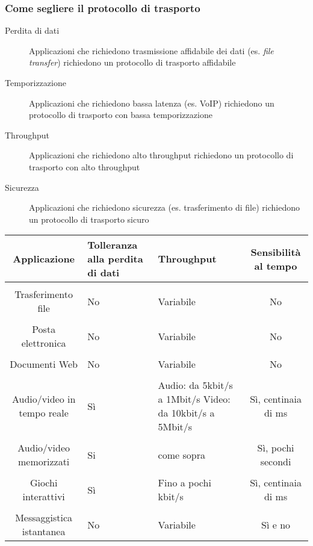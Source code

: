         \subsubsection{Come segliere il protocollo di trasporto}
            \begin{description}
                \item[Perdita di dati] Applicazioni che richiedono trasmissione affidabile dei dati (es. \textit{file transfer}) richiedono un protocollo di trasporto affidabile
                \item[Temporizzazione] Applicazioni che richiedono bassa latenza (es. \Acrshort*{VoIP}) richiedono un protocollo di trasporto con bassa temporizzazione
                \item[Throughput] Applicazioni che richiedono alto throughput richiedono un protocollo di trasporto con alto throughput
                \item[Sicurezza] Applicazioni che richiedono sicurezza (es. trasferimento di file) richiedono un protocollo di trasporto sicuro
            \end{description}
            \begin{table}[H]
                \centering
                \begin{adjustbox}{max width=\textwidth}
                    \begin{tabular}{c p{7em} p{13em} c}
                        \textbf{Applicazione} & \textbf{Tolleranza alla perdita di dati} & \textbf{Throughput} & \textbf{Sensibilità al tempo} \\
                        \hline\\
                        Trasferimento file & No & Variabile & No \\
                        \hline\\
                        Posta elettronica & No & Variabile & No \\
                        \hline \\
                        Documenti Web & No & Variabile & No \\
                        \hline \\
                        Audio/video in tempo reale & Sì & Audio: da 5kbit/s a 1Mbit/s Video: da 10kbit/s a 5Mbit/s & Sì, centinaia di ms \\
                        \hline \\
                        Audio/video memorizzati & Si & come sopra & Sì, pochi secondi \\
                        \hline \\
                        Giochi interattivi & Sì & Fino a pochi kbit/s & Sì, centinaia di ms \\
                        \hline \\
                        Messaggistica istantanea & No & Variabile & Sì e no \\
                        \hline
                    \end{tabular}
                \end{adjustbox}
            \end{table}
